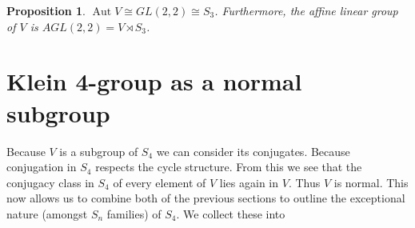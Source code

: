 \documentclass[12pt]{article}
\DeclareMathOperator{\Aut}{Aut }
\newtheorem{prop}[thm]{Proposition}
\begin{document}
\begin{prop}\label{prop:agl}
$\Aut V\cong GL(2,2)\cong S_3$.  Furthermore, the affine linear group
of $V$ is $AGL(2,2)=V\rtimes S_3$.
\end{prop}

\section{Klein 4-group as a normal subgroup}

Because $V$ is a subgroup of $S_4$ we can consider its conjugates.  Because
conjugation in $S_4$ respects the cycle structure.  From this we see that
the conjugacy class in $S_4$ of every element of $V$ lies again in $V$.  Thus
$V$ is normal.  This now allows us to combine both of the previous sections
to outline the exceptional nature (amongst $S_n$ families) of $S_4$.  We 
collect these into
\end{document}
